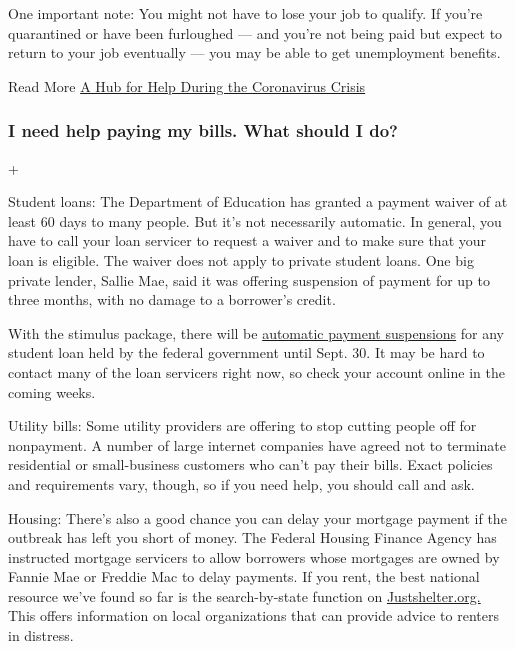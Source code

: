 One important note: You might not have to lose your job to qualify. If
you're quarantined or have been furloughed --- and you're not being paid
but expect to return to your job eventually --- you may be able to get
unemployment benefits.

 Read More
\href{https://www.nytimes.com/article/coronavirus-money-unemployment.html}{A
Hub for Help During the Coronavirus Crisis}

\hypertarget{i-need-help-paying-my-bills-what-should-i-do}{%
\subsubsection{I need help paying my bills. What should I
do?}\label{i-need-help-paying-my-bills-what-should-i-do}}

+

Student loans: The Department of Education has granted a payment waiver
of at least 60 days to many people. But it's not necessarily automatic.
In general, you have to call your loan servicer to request a waiver and
to make sure that your loan is eligible. The waiver does not apply to
private student loans. One big private lender, Sallie Mae, said it was
offering suspension of payment for up to three months, with no damage to
a borrower's credit.

With the stimulus package, there will be
\href{https://www.nytimes.com/article/coronavirus-stimulus-package-questions-answers.html}{automatic
payment suspensions} for any student loan held by the federal government
until Sept. 30. It may be hard to contact many of the loan servicers
right now, so check your account online in the coming weeks.

Utility bills: Some utility providers are offering to stop cutting
people off for nonpayment. A number of large internet companies have
agreed not to terminate residential or small-business customers who
can't pay their bills. Exact policies and requirements vary, though, so
if you need help, you should call and ask.

Housing: There's also a good chance you can delay your mortgage payment
if the outbreak has left you short of money. The Federal Housing Finance
Agency has instructed mortgage servicers to allow borrowers whose
mortgages are owned by Fannie Mae or Freddie Mac to delay payments. If
you rent, the best national resource we've found so far is the
search-by-state function on
\href{https://justshelter.org/community-resources/}{Justshelter.org.}
This offers information on local organizations that can provide advice
to renters in distress.

